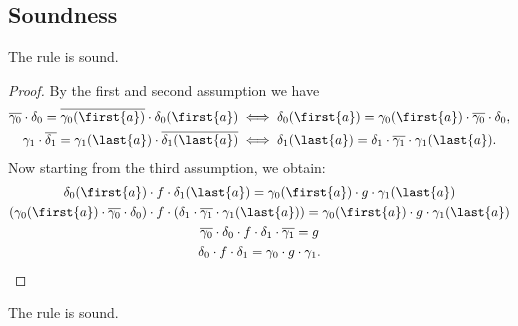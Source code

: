 \subsection{Soundness}


\begin{lemma}\label{lem:good-bounds-rule-soundness}
    The rule  is sound.
\end{lemma}

\begin{proof}
    By the first and second assumption we have
    \begin{gather*}
        \overline{\gamma_0} \cdot \delta_0 = \overline{\gamma_0(\first{a})} \cdot \delta_0(\first{a}) \iff \delta_0(\first{a}) = \gamma_0(\first{a}) \cdot \overline{\gamma_0} \cdot \delta_0, \\ 
        \gamma_1 \cdot \overline{\delta_1} = \gamma_1(\last{a}) \cdot \overline{\delta_1(\last{a})} \iff \delta_1(\last{a}) = \delta_1 \cdot \overline{\gamma_1} \cdot \gamma_1(\last{a}).
    \end{gather*}
    Now starting from the third assumption, we obtain:
    \begin{gather*}
        \delta_0(\first{a}) \cdot f \cdot \delta_1(\last{a}) = \gamma_0(\first{a}) \cdot g \cdot \gamma_1(\last{a}) \\ 
        \left( \gamma_0(\first{a}) \cdot \overline{\gamma_0} \cdot \delta_0 \right)  \cdot f \cdot \left( \delta_1 \cdot \overline{\gamma_1} \cdot \gamma_1(\last{a}) \right) = \gamma_0(\first{a}) \cdot g \cdot \gamma_1(\last{a}) \\ 
        \overline{\gamma_0} \cdot \delta_0 \cdot f \cdot \delta_1 \cdot \overline{\gamma_1} = g \\
        \delta_0 \cdot f \cdot \delta_1 = \gamma_0 \cdot g \cdot \gamma_1. \qedhere
    \end{gather*}
\end{proof}

\begin{lemma}\label{lem:good-interface-rule-soundness}
    The rule  is sound.
\end{lemma}

